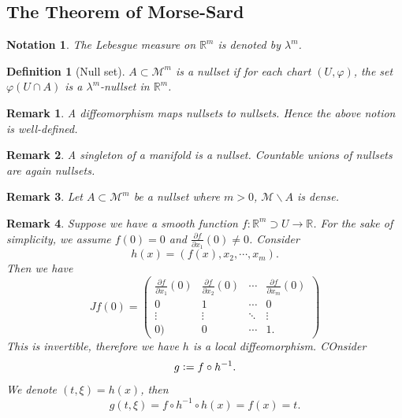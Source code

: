 \documentclass[10pt]{article}
\newtheorem{definition}{Definition}[section]
\newtheorem{notation}{Notation}[section]
\newtheorem{remark}{Remark}[section]
\newcommand{\defeq}{\vcentcolon=}
\newcommand{\R}[0]{\mathbb{R}}
\newcommand{\M}[0]{\mathcal{M}}
\newcommand{\pd}[2]{{\frac {\partial #1} {\partial #2}}}
\begin{document}
\subsection{The Theorem of Morse-Sard}
\begin{notation}
The Lebesgue measure on $\R^m$ is denoted by $\lambda^m$. 
\end{notation}
\begin{definition}[Null set]
  $A\subset \M^m$ is a nullset if for each chart $(U,\varphi)$, the set $\varphi(U\cap A)$ is a $\lambda^m$-nullset in $\R^m$. 
\end{definition}
\begin{remark}
  A diffeomorphism maps nullsets to nullsets. Hence the above notion is well-defined.
\end{remark}
\begin{remark}
  A singleton of a manifold is a nullset. Countable unions of nullsets are again nullsets.
\end{remark}
\begin{remark}
  Let $A\subset\M^m$ be a nullset where $m>0$, $\M\backslash A$ is dense.
\end{remark}
\begin{remark}
  Suppose we have a smooth function $f:\R^m\supset U\to\R$. For the sake of simplicity, we assume $f(0) = 0$ and $\pd{f}{x_1}(0)\not=0$. Consider 
  \begin{equation*}
    h(x) = (f(x),x_2,\cdots,x_m).
  \end{equation*}
  Then we have 
  \begin{equation*}
    Jf(0) = \begin{pmatrix}
      \pd{f}{x_1}(0) & \pd{f}{x_2}(0)&\cdots &\pd{f}{x_m}(0)\\
      0 & 1 & \cdots & 0\\
      \vdots & \vdots & \ddots & \vdots\\
      0) & 0 & \cdots & 1.
    \end{pmatrix}
  \end{equation*}
  This is invertible, therefore we have $h$ is a local diffeomorphism. COnsider 
  \begin{equation*}
    g \defeq f\circ h^{-1}.
  \end{equation*}
  We denote $(t,\xi) = h(x)$, then 
  \begin{equation*}
    g(t,\xi) = f\circ h^{-1}\circ h (x) = f(x) = t.
  \end{equation*}
  \label{local_diffeo_section}
\end{remark}
\end{document}
